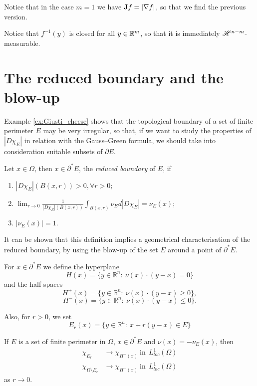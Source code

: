 Notice that in the case $m = 1$ we have ${\bf J} f = |\nabla f|$, so that we find the previous version.

\begin{remark}
Notice that $f^{-1}(y)$ is closed for all $y \in \mathbb{R}^{m}$, so that it is immediately $\mathscr{H}^{n - m}$-measurable.
\end{remark}





\section{The reduced boundary and the blow-up}

Example \ref{ex:Giusti_cheese} shows that the topological boundary of a set of finite perimeter $E$ may be very irregular, so that, if we want to study the properties of $|D\chi_E|$ in relation with the Gauss--Green formula, we should take into consideration suitable subsets of $\partial E$.

\begin{definition} \label{reducedboundary} Let $x \in \Omega$, then $x \in \partial^{*}E$, the {\em reduced boundary} of $E$, if
\begin{enumerate}
	\item $|D\chi_{E}|(B(x,r)) > 0, \forall r >0;$
	\item $\lim_{r \to 0} \frac{1}{|D\chi_{E}|(B(x,r))} \int_{B(x,r)} \nu_{E} d|D\chi_{E}| = \nu_{E} (x);$
	\item $|\nu_{E}(x)| = 1.$
\end{enumerate}
\end{definition}

It can be shown that this definition implies a geometrical characterisation of the reduced boundary, by using the blow-up of the set $E$ around a point of $\partial^{*} E$.

\begin{definition} For $x \in \partial^{*}E$ we define the hyperplane
\[H(x) = \{ y \in \mathbb{R}^{n} : \ \nu(x) \cdot (y - x) = 0 \} \]
and the half-spaces
\[H^{+}(x) = \{ y \in \mathbb{R}^{n} : \ \nu(x) \cdot (y - x) \ge 0 \}, \]
\[H^{-}(x) = \{ y \in \mathbb{R}^{n} : \ \nu(x) \cdot (y - x) \le 0 \}. \]

Also, for $r > 0$, we set
\[ E_{r} (x) = \{ y \in \mathbb{R}^{n} : \ x + r(y - x) \in E \} \]
\end{definition}

\begin{theorem} \label{convblowup} If $E$ is a set of finite perimeter in $\Omega$, $x \in \partial^{*}E$ and $\nu(x) = - \nu_{E}(x)$, then
\begin{align*} \chi_{E_{r}} & \to \chi_{H^{-}(x)}  \ \mathrm{in} \ \ L^{1}_{loc}(\Omega) \\
\chi_{\Omega \setminus E_{r}} & \to \chi_{H^{-}(x)}  \ \mathrm{in} \ \ L^{1}_{loc}(\Omega) \end{align*}
as $r \to 0$.
\end{theorem}

